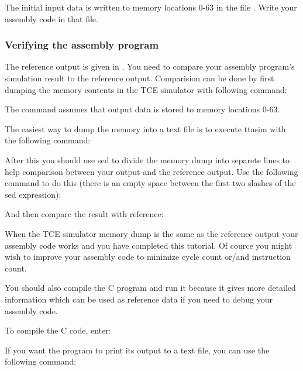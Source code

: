 \documentclass[twoside]{tceusermanual}
\begin{document}
The initial input data is written to memory locations 0-63 in the file
. Write your assembly code in that file.

\subsubsection{Verifying the assembly program}

The reference output is given in . You need to
compare your assembly program's simulation result to the reference
output. Comparision can be done by first dumping the memory contents in the
TCE simulator with following command:


The command assumes that output data is stored to memory locations 0-63.

The easiest way to dump the memory into a text file is to execute ttasim with
the following command:


After this you should use sed to divide the memory dump into separete lines
to help comparison between your output and the reference output. Use the
following command to do this (there is an empty space between the
first two slashes of the sed expression):


And then compare the result with reference:


When the TCE simulator memory dump is the same as the reference output your
assembly code works and you have completed this tutorial. Of
cource you might wish to improve your assembly code to minimize cycle
count or/and instruction count.

You should also compile the C program and run it because it gives more
detailed information which can be used as reference data if you need to debug
your assembly code.

To compile the C code, enter:


If you want the program to print its output to a text file, you can use the
following command:

\end{document}
